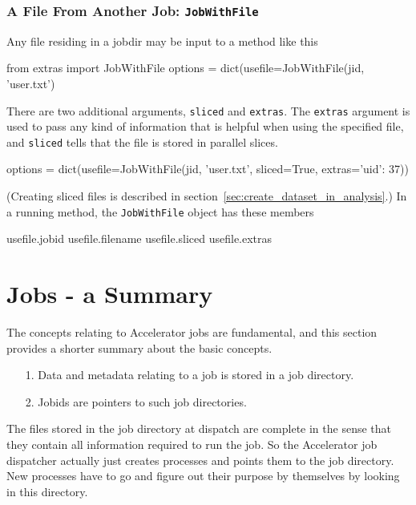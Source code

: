 \subsubsection*{A File From Another Job:  \texttt{JobWithFile}}
\label{sec:jobwithfile}

Any file residing in a jobdir may be input to a method like this
\begin{python}
from extras import JobWithFile
options = dict(usefile=JobWithFile(jid, 'user.txt')
\end{python}
There are two additional arguments, \texttt{sliced} and
\texttt{extras}.  The \texttt{extras} argument is used to pass any
kind of information that is helpful when using the specified file, and
\texttt{sliced} tells that the file is stored in parallel slices.
\begin{python}
options = dict(usefile=JobWithFile(jid, 'user.txt', sliced=True, extras={'uid': 37}))
\end{python}
(Creating sliced files is described in section~\ref{sec:create_dataset_in_analysis}.)  In a
running method, the \texttt{JobWithFile} object has these members
\begin{python}
usefile.jobid
usefile.filename
usefile.sliced
usefile.extras
\end{python}





\section{Jobs - a Summary}
The concepts relating to Accelerator jobs are fundamental, and this
section provides a shorter summary about the basic concepts.

\begin{itemize}
\item[1.]  Data and metadata relating to a job is stored in a
job directory.
\item[2.]  Jobids are pointers to such job directories.
\end{itemize}
The files stored in the job directory at dispatch are complete in the
sense that they contain all information required to run the job.  So
the Accelerator job dispatcher actually just creates processes and
points them to the job directory.  New processes have to go and figure
out their purpose by themselves by looking in this directory.

